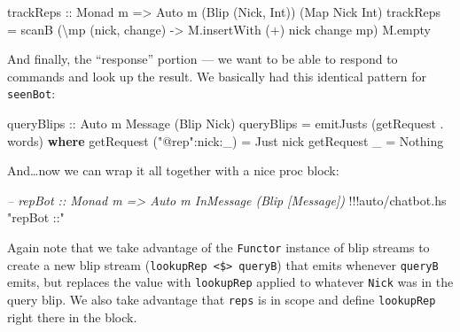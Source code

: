 \documentclass[]{article}
\newenvironment{Shaded}{}{}
\newcommand{\KeywordTok}[1]{\textcolor[rgb]{0.00,0.44,0.13}{\textbf{{#1}}}}
\newcommand{\DataTypeTok}[1]{\textcolor[rgb]{0.56,0.13,0.00}{{#1}}}
\newcommand{\StringTok}[1]{\textcolor[rgb]{0.25,0.44,0.63}{{#1}}}
\newcommand{\CommentTok}[1]{\textcolor[rgb]{0.38,0.63,0.69}{\textit{{#1}}}}
\newcommand{\OtherTok}[1]{\textcolor[rgb]{0.00,0.44,0.13}{{#1}}}
\newcommand{\FunctionTok}[1]{\textcolor[rgb]{0.02,0.16,0.49}{{#1}}}
\newcommand{\NormalTok}[1]{{#1}}
\begin{document}
\begin{Shaded}
\begin{Highlighting}[]
\OtherTok{trackReps ::} \DataTypeTok{Monad} \NormalTok{m }\OtherTok{=>} \DataTypeTok{Auto} \NormalTok{m (}\DataTypeTok{Blip} \NormalTok{(}\DataTypeTok{Nick}\NormalTok{, }\DataTypeTok{Int}\NormalTok{)) (}\DataTypeTok{Map} \DataTypeTok{Nick} \DataTypeTok{Int}\NormalTok{)}
\NormalTok{trackReps }\FunctionTok{=} \NormalTok{scanB (\textbackslash{}mp (nick, change) }\OtherTok{->} \NormalTok{M.insertWith (}\FunctionTok{+}\NormalTok{) nick change mp) M.empty}
\end{Highlighting}
\end{Shaded}

And finally, the ``response'' portion --- we want to be able to respond
to commands and look up the result. We basically had this identical
pattern for \texttt{seenBot}:

\begin{Shaded}
\begin{Highlighting}[]
\OtherTok{queryBlips ::} \DataTypeTok{Auto} \NormalTok{m }\DataTypeTok{Message} \NormalTok{(}\DataTypeTok{Blip} \DataTypeTok{Nick}\NormalTok{)}
\NormalTok{queryBlips }\FunctionTok{=} \NormalTok{emitJusts (getRequest }\FunctionTok{.} \NormalTok{words)}
  \KeywordTok{where}
    \NormalTok{getRequest (}\StringTok{"@rep"}\FunctionTok{:}\NormalTok{nick}\FunctionTok{:}\NormalTok{_) }\FunctionTok{=} \DataTypeTok{Just} \NormalTok{nick}
    \NormalTok{getRequest _                }\FunctionTok{=} \DataTypeTok{Nothing}
\end{Highlighting}
\end{Shaded}

And\ldots{}now we can wrap it all together with a nice proc block:

\begin{Shaded}
\begin{Highlighting}[]
\CommentTok{-- repBot :: Monad m => Auto m InMessage (Blip [Message])}
\FunctionTok{!!!}\NormalTok{auto}\FunctionTok{/}\NormalTok{chatbot}\FunctionTok{.}\NormalTok{hs }\StringTok{"repBot ::"}
\end{Highlighting}
\end{Shaded}

Again note that we take advantage of the \texttt{Functor} instance of
blip streams to create a new blip stream
(\texttt{lookupRep\ \textless{}\$\textgreater{}\ queryB}) that emits
whenever \texttt{queryB} emits, but replaces the value with
\texttt{lookupRep} applied to whatever \texttt{Nick} was in the query
blip. We also take advantage that \texttt{reps} is in scope and define
\texttt{lookupRep} right there in the block.
\end{document}
